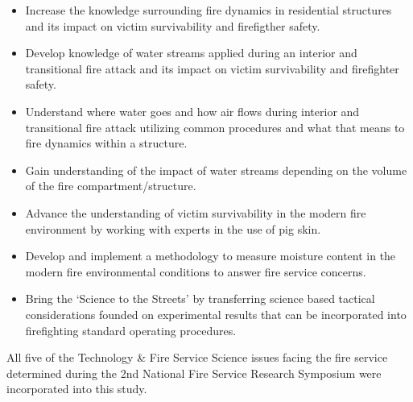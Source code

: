 \documentclass[12pt,oneside]{book}
\begin{document}
\begin{itemize}
	\item Increase the knowledge surrounding fire dynamics in residential structures and its impact on victim survivability and firefigther safety.
	\item Develop knowledge of water streams applied during an interior and transitional fire attack and its impact on victim survivability and firefighter safety.
	\item Understand where water goes and how air flows during interior and transitional fire attack utilizing common procedures and what that means to fire dynamics within a structure.
	\item Gain understanding of the impact of water streams depending on the volume of the fire compartment/structure.
	\item Advance the understanding of victim survivability in the modern fire environment by working with experts in the use of pig skin.
	\item Develop and implement a methodology to measure moisture content in the modern fire environmental conditions to answer fire service concerns.
	\item Bring the `Science to the Streets' by transferring science based tactical considerations founded on experimental results that can be incorporated into firefighting standard operating procedures.
	\end{itemize}

All five of the Technology \& Fire Service Science issues facing the fire service determined during the 2nd National Fire Service Research Symposium \cite{NFFF} were incorporated into this study.

\clearpage




\end{document}
